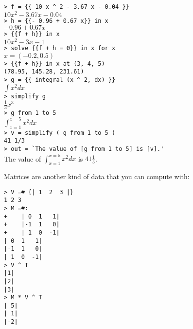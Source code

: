 \documentclass[12pt]{article}
\newenvironment{indpar}[1][0.3in]%
	{\begin{list}{}%
		     {\setlength{\itemsep}{0in}%
		      \setlength{\topsep}{0in}%
		      \setlength{\parsep}{1ex}%
		      \setlength{\labelwidth}{#1}%
		      \setlength{\leftmargin}{#1}%
		      \addtolength{\leftmargin}{\labelsep}}%
	 \item}%
	{\end{list}}
\begin{document}
\begin{indpar}
\verb/> f = {{ 10 x ^ 2 - 3.67 x - 0.04 }}/ \\
$10x^2-3.67x-0.04$ \\
\verb/> h = {{- 0.96 + 0.67 x}} in x/ \\
$-0.96+0.67x$ \\
\verb/> {{f + h}} in x/ \\
$10x^2-3x-1$ \\
\verb/> solve {{f + h = 0}} in x for x/ \\
$x = (-0.2, 0.5)$ \\
\verb/> {{f + h}} in x at (3, 4, 5)/ \\
\verb/(78.95, 145.28, 231.61)/ \\
\verb/> g = {{ integral (x ^ 2, dx) }}/ \\
$\int x^2 dx$ \\
\verb/> simplify g/ \\
$\frac{1}{3} x^3$ \\
\verb/> g from 1 to 5/ \\
$\int_{x = 1}^{x = 5} x^2 dx$ \\
\verb/> v = simplify ( g from 1 to 5 )/ \\
\verb:41 1/3: \\
\verb/> out = `The value of [g from 1 to 5] is [v].'/ \\
The value of $\int_{x = 1}^{x = 5} x^2 dx$ is $41\frac{1}{3}$.
\end{indpar}

Matrices are another kind of data that you can compute
with:

\begin{indpar}
\verb/> V =# {| 1  2  3 |}/ \\
\verb/1 2 3/ \\
\verb/> M =#:/ \\
\verb/+    | 0  1   1|/ \\
\verb/+    |-1  1   0|/ \\
\verb/+    | 1  0  -1|/ \\
\verb/| 0  1   1|/ \\
\verb/|-1  1   0|/ \\
\verb/| 1  0  -1|/ \\
\verb/> V ^ T/ \\
\verb/|1|/ \\
\verb/|2|/ \\
\verb/|3|/ \\
\verb/> M * V ^ T/ \\
\verb/| 5|/ \\
\verb/| 1|/ \\
\verb/|-2|/
\end{indpar}
\end{document}
